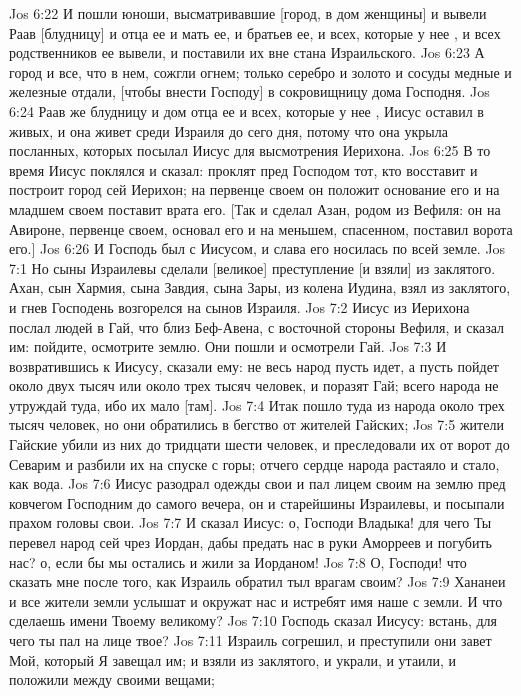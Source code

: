 \vs Jos 6:22 И пошли юноши, высматривавшие [город, в дом женщины] и вывели Раав [блудницу] и отца ее и мать ее, и братьев ее, и всех, которые у нее , и всех родственников ее вывели, и поставили их вне стана Израильского.
\vs Jos 6:23 А город и все, что в нем, сожгли огнем; только серебро и золото и сосуды медные и железные отдали, [чтобы внести Господу] в сокровищницу дома Господня.
\vs Jos 6:24 Раав же блудницу и дом отца ее и всех, которые у нее , Иисус оставил в живых, и она живет среди Израиля до сего дня, потому что она укрыла посланных, которых посылал Иисус для высмотрения Иерихона.
\rsbpar\vs Jos 6:25 В то время Иисус поклялся и сказал: проклят пред Господом тот, кто восставит и построит город сей Иерихон; на первенце своем он положит основание его и на младшем своем поставит врата его. [Так и сделал Азан, родом из Вефиля: он на Авироне, первенце своем, основал его и на меньшем, спасенном, поставил ворота его.]
\vs Jos 6:26 И Господь был с Иисусом, и слава его носилась по всей земле.
\vs Jos 7:1 Но сыны Израилевы сделали [великое] преступление [и взяли] из заклятого. Ахан, сын Хармия, сына Завдия, сына Зары, из колена Иудина, взял из заклятого, и гнев Господень возгорелся на сынов Израиля.
\vs Jos 7:2 Иисус из Иерихона послал людей в Гай, что близ Беф-Авена, с восточной стороны Вефиля, и сказал им: пойдите, осмотрите землю. Они пошли и осмотрели Гай.
\vs Jos 7:3 И возвратившись к Иисусу, сказали ему: не весь народ пусть идет, а пусть пойдет около двух тысяч или около трех тысяч человек, и поразят Гай; всего народа не утруждай туда, ибо их мало [там].
\vs Jos 7:4 Итак пошло туда из народа около трех тысяч человек, но они обратились в бегство от жителей Гайских;
\vs Jos 7:5 жители Гайские убили из них до тридцати шести человек, и преследовали их от ворот до Севарим и разбили их на спуске с горы; отчего сердце народа растаяло и стало, как вода.
\vs Jos 7:6 Иисус разодрал одежды свои и пал лицем своим на землю пред ковчегом Господним  до самого вечера, он и старейшины Израилевы, и посыпали прахом головы свои.
\vs Jos 7:7 И сказал Иисус: о, Господи Владыка! для чего Ты перевел народ сей чрез Иордан, дабы предать нас в руки Аморреев и погубить нас? о, если бы мы остались и жили за Иорданом!
\vs Jos 7:8 О, Господи! что сказать мне после того, как Израиль обратил тыл врагам своим?
\vs Jos 7:9 Хананеи и все жители земли услышат и окружат нас и истребят имя наше с земли. И что сделаешь  имени Твоему великому?
\rsbpar\vs Jos 7:10 Господь сказал Иисусу: встань, для чего ты пал на лице твое?
\vs Jos 7:11 Израиль согрешил, и преступили они завет Мой, который Я завещал им; и взяли из заклятого, и украли, и утаили, и положили между своими вещами;
